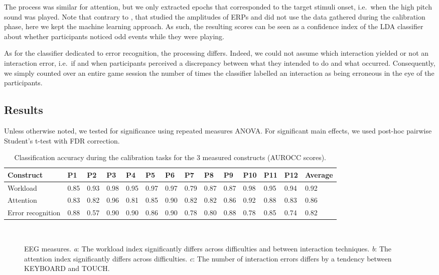 \documentclass[]{sigchi}
\begin{document}
The process was similar for attention, but we only extracted epochs that
corresponded to the target stimuli onset, i.e.~when the high pitch sound
was played. Note that contrary to \citep{Burns2015}, that studied the
amplitudes of ERPs and did not use the data gathered during the
calibration phase, here we kept the machine learning approach. As such,
the resulting scores can be seen as a confidence index of the LDA
classifier about whether participants noticed odd events while they were
playing.

As for the classifier dedicated to error recognition, the processing
differs. Indeed, we could not assume which interaction yielded or not an
interaction error, i.e.~if and when participants perceived a discrepancy
between what they intended to do and what occurred. Consequently, we
simply counted over an entire game session the number of times the
classifier labelled an interaction as being erroneous in the eye of the
participants.

\subsection{Results}\label{results-1}

Unless otherwise noted, we tested for significance using repeated
measures ANOVA. For significant main effects, we used post-hoc pairwise
Student's t-test with FDR correction.

\begin{table*}
\centering
\begin{tabular}{llllllllllllll}
\toprule\addlinespace
Construct & P1 & P2 & P3 & P4 & P5 & P6 & P7 & P8 & P9 & P10 & P11 & P12
& Average\tabularnewline
\midrule
Workload & 0.85 & 0.93 & 0.98 & 0.95 & 0.97 & 0.97 & 0.79 & 0.87 & 0.87
& 0.98 & 0.95 & 0.94 & 0.92\tabularnewline
Attention & 0.83 & 0.82 & 0.96 & 0.81 & 0.85 & 0.90 & 0.82 & 0.82 & 0.86
& 0.92 & 0.88 & 0.83 & 0.86\tabularnewline
Error recognition & 0.88 & 0.57 & 0.90 & 0.90 & 0.86 & 0.90 & 0.78 &
0.80 & 0.88 & 0.78 & 0.85 & 0.74 & 0.82\tabularnewline
\bottomrule
\end{tabular}
\caption{Classification accuracy during the calibration tasks for the 3
measured constructs (AUROCC scores).}\label{tab:classification}
\end{table*}

\begin{figure}
\centering
{}
\\
\caption{EEG measures. \emph{a}: The workload index significantly
differs across difficulties and between interaction techniques.
\emph{b}: The attention index significantly differs across difficulties.
\emph{c}: The number of interaction errors differs by a tendency between
KEYBOARD and TOUCH.}\label{fig:EEG-stats}
\end{figure}
\end{document}
